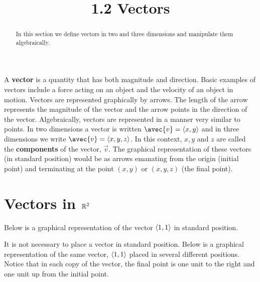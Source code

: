\documentclass[handout]{ximera}
\title{1.2 Vectors}
\begin{document}
\begin{abstract}
In this section we define vectors in two and three dimensions and manipulate them algebraically.
\end{abstract}
 
\maketitle

A {\bf vector} is a quantity that has both magnitude and direction. Basic examples of vectors include a force acting on an object and the velocity of an object in motion.
Vectors are represented graphically by arrows.  The length of the arrow represents the magnitude of the vector and the arrow points in the direction of the vector.
Algebraically, vectors are represented in a manner very similar to points.  In two dimensions a vector is written $\avec{v} = \vector{x,y}$ and in three dimensions we write 
$\avec{v} = \vector{x,y, z}$.  In this context, $x, y$ and $z$ are called the {\bf components} of the vector, $\vec{v}$. 
The graphical representation of these vectors (in standard position)
would be as arrows emanating from the origin (initial point) and terminating at the point $(x,y)$ or $(x,y,z)$ (the final point).

\section{Vectors in $\mathbb R^2$}
Below is a graphical representation of the vector $\left\langle 1,1\right\rangle$ in standard position.

\begin{image}
\end{image}

It is not necessary to place a vector in standard position.  Below is a graphical representation of the same vector, $\left\langle 1,1\right\rangle$ placed in several different positions.
Notice that in each copy of the vector, the final point is one unit to the right and one unit up from the initial point.
\begin{image}
\end{image}
\end{document}

